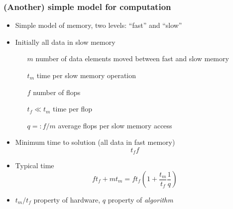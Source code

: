 \documentclass[presentation,aspectratio=43,10pt]{beamer}
\begin{document}
\begin{frame}
  \frametitle{(Another) simple model for computation}
  \begin{itemize}
  \item Simple model of memory, two levels: ``fast'' and ``slow''
  \item Initially all data in slow memory
    \begin{itemize}
    \item[$m$] number of data elements moved between fast and slow memory
    \item[$t_m$] time per slow memory operation
    \item[$f$] number of flops
    \item[$t_f \ll t_m$] time per flop
    \item[$q =: f/m$] average flops per slow memory access
    \end{itemize}
  \item Minimum time to solution (all data in fast memory)
    \begin{equation*}
      t_f f
    \end{equation*}
  \item Typical time
    \begin{equation*}
      f t_f + m t_m = f t_f \left(1 + \frac{t_m}{t_f}\frac{1}{q}\right)
    \end{equation*}

  \item $t_m / t_f$ property of hardware, $q$ property of \emph{algorithm}
  \end{itemize}
\end{frame}
\end{document}
